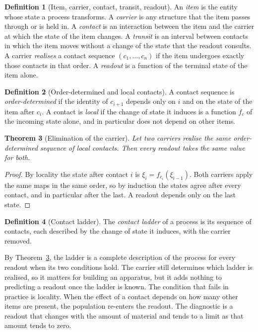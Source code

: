 \documentclass[11pt,a4paper]{article}
\newtheorem{theorem}{Theorem}[section]
\theoremstyle{definition}
\newtheorem{definition}[theorem]{Definition}
\theoremstyle{remark}
\begin{document}
\begin{definition}[Item, carrier, contact, transit, readout]
\label{def:terms}
An \emph{item} is the entity whose state a process transforms.
A \emph{carrier} is any structure that the item passes through or is held in.
A \emph{contact} is an interaction between the item and the carrier at which the state of the item changes.
A \emph{transit} is an interval between contacts in which the item moves without a change of the state that the readout consults.
A carrier \emph{realises} a contact sequence $(c_1,\dots,c_n)$ if the item undergoes exactly those contacts in that order.
A \emph{readout} is a function of the terminal state of the item alone.
\end{definition}

\begin{definition}[Order-determined and local contacts]
\label{def:hypotheses}
A contact sequence is \emph{order-determined} if the identity of $c_{i+1}$ depends only on $i$ and on the state of the item after $c_i$.
A contact is \emph{local} if the change of state it induces is a function $f_c$ of the incoming state alone, and in particular does not depend on other items.
\end{definition}

\begin{theorem}[Elimination of the carrier]
\label{thm:elimination}
Let two carriers realise the same order-determined sequence of local contacts.
Then every readout takes the same value for both.
\end{theorem}

\begin{proof}
By locality the state after contact $i$ is $\xi_i=f_{c_i}(\xi_{i-1})$.
Both carriers apply the same maps in the same order, so by induction the states agree after every contact, and in particular after the last.
A readout depends only on the last state.
\end{proof}

\begin{definition}[Contact ladder]
\label{def:ladder}
The \emph{contact ladder} of a process is its sequence of contacts, each described by the change of state it induces, with the carrier removed.
\end{definition}

By Theorem~\ref{thm:elimination}, the ladder is a complete description of the process for every readout when its two conditions hold.
The carrier still determines which ladder is realised, so it matters for building an apparatus, but it adds nothing to predicting a readout once the ladder is known.
The condition that fails in practice is locality.
When the effect of a contact depends on how many other items are present, the population re-enters the readout.
The diagnostic is a readout that changes with the amount of material and tends to a limit as that amount tends to zero.
\end{document}
